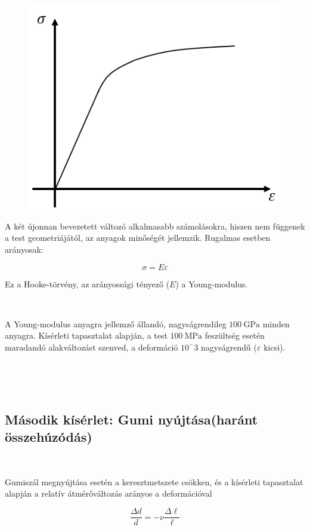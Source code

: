 \documentclass[a4paper, 12pt]{article}
\begin{document}
\begin{figure}[h]
\centering
\includegraphics[scale=0.5]{tetel1_3.png}
\caption{}
\end{figure}

A két újonnan bevezetett változó alkalmasabb számolásokra, hiszen nem függenek a test geometriájától, az anyagok minőségét jellemzik. Rugalmas esetben arányosak:

$$\sigma=E\varepsilon$$ 
 
Ez a Hooke-törvény, az arányossági tényező ($E$) a Young-modulus. 

~

A Young-modulus anyagra jellemző állandó, nagyságrendileg $100~ \mathrm{GPa}$ minden anyagra. Kísérleti tapasztalat alapján, a test $100~\mathrm{MPa}$ feszültség esetén maradandó alakváltozást szenved, a deformáció $10^-3$ nagyságrendű ($\varepsilon$ kicsi).

~

~




\subsection*{Második kísérlet: Gumi nyújtása(haránt összehúzódás)}

~

Gumiszál megnyújtása esetén a keresztmetszete csökken, és a kísérleti tapasztalat alapján a relatív átmérőváltozás arányos a deformációval
            
$$\frac{\Delta d}{d}=-\nu\frac{\Delta\ell}{\ell}$$
\end{document}
